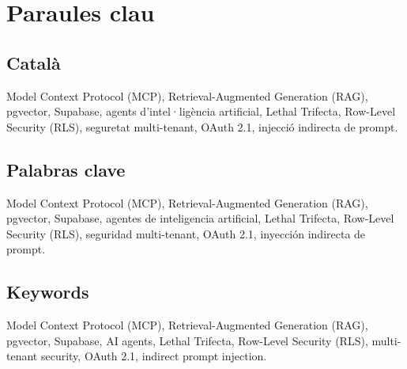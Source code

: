 \chapter{Paraules clau}
\label{ch:paraules-clau}

\section*{Català}

Model Context Protocol (MCP), Retrieval-Augmented Generation (RAG), pgvector,
Supabase, agents d'intel·ligència artificial, Lethal Trifecta, Row-Level
Security (RLS), seguretat multi-tenant, OAuth 2.1, injecció indirecta de
prompt.

\section*{Palabras clave}

Model Context Protocol (MCP), Retrieval-Augmented Generation (RAG), pgvector,
Supabase, agentes de inteligencia artificial, Lethal Trifecta, Row-Level
Security (RLS), seguridad multi-tenant, OAuth 2.1, inyección indirecta de
prompt.

\section*{Keywords}

Model Context Protocol (MCP), Retrieval-Augmented Generation (RAG), pgvector,
Supabase, AI agents, Lethal Trifecta, Row-Level Security (RLS), multi-tenant
security, OAuth 2.1, indirect prompt injection.

